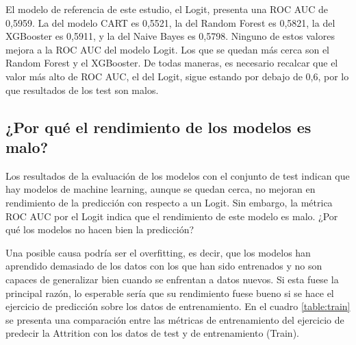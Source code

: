 El modelo de referencia de este estudio, el Logit, presenta una ROC AUC de 0,5959. La del modelo CART es 0,5521, la del Random Forest es 0,5821, la del XGBooster es 0,5911, y la del Naive Bayes es 0,5798. Ninguno de estos valores mejora a la ROC AUC del modelo Logit. Los que se quedan más cerca son el Random Forest y el XGBooster. De todas maneras, es necesario recalcar que el valor más alto de ROC AUC, el del Logit, sigue estando por debajo de 0,6, por lo que resultados de los test son malos.

\subsection*{¿Por qué el rendimiento de los modelos es malo?}

Los resultados de la evaluación de los modelos con el conjunto de test indican que hay modelos de machine learning, aunque se quedan cerca, no mejoran en rendimiento de la predicción con respecto a un Logit. Sin embargo, la métrica ROC AUC por el Logit indica que el rendimiento de este modelo es malo. ¿Por qué los modelos no hacen bien la predicción?

Una posible causa podría ser el overfitting, es decir, que los modelos han aprendido demasiado de los datos con los que han sido entrenados y no son capaces de generalizar bien cuando se enfrentan a datos nuevos. Si esta fuese la principal razón, lo esperable sería que su rendimiento fuese bueno si se hace el ejercicio de predicción sobre los datos de entrenamiento. En el cuadro \ref{table:train} se presenta una comparación entre las métricas de entrenamiento del ejercicio de predecir la Attrition con los datos de test y de entrenamiento (Train).

